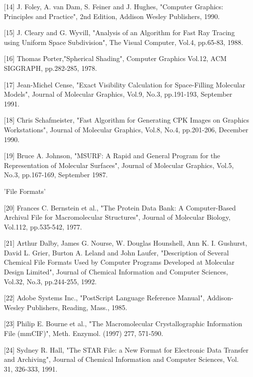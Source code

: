 [14] J. Foley, A. van Dam, S. Feiner and J. Hughes, "Computer Graphics:
Principles and Practice", 2nd Edition, Addison Wesley Publishers, 1990.

[15] J. Cleary and G. Wyvill, "Analysis of an Algorithm for Fast Ray
Tracing using Uniform Space Subdivision", The Visual Computer, Vol.4,
pp.65-83, 1988.

[16] Thomas Porter,"Spherical Shading", Computer Graphics Vol.12, ACM
SIGGRAPH, pp.282-285, 1978.

[17] Jean-Michel Cense, "Exact Visibility Calculation for Space-Filling
Molecular Models", Journal of Molecular Graphics, Vol.9, No.3,
pp.191-193, September 1991.

[18] Chris Schafmeister, "Fast Algorithm for Generating CPK Images on
Graphics Workstations", Journal of Molecular Graphics, Vol.8, No.4,
pp.201-206, December 1990.

[19] Bruce A. Johnson, "MSURF: A Rapid and General Program for the
Representation of Molecular Surfaces", Journal of Molecular Graphics,
Vol.5, No.3, pp.167-169, September 1987.

'File Formats'

[20] Frances C. Bernstein et al., "The Protein Data Bank: A
Computer-Based Archival File for Macromolecular Structures", Journal of
Molecular Biology, Vol.112, pp.535-542, 1977.

[21] Arthur Dalby, James G. Nourse, W. Douglas Hounshell, Ann K. I.
Gushurst, David L. Grier, Burton A. Leland and John Laufer, "Description
of Several Chemical File Formats Used by Computer Programs Developed at
Molecular Design Limited", Journal of Chemical Information and Computer
Sciences, Vol.32, No.3, pp.244-255, 1992.

[22] Adobe Systems Inc., "PostScript Language Reference Manual",
Addison-Wesley Publishers, Reading, Mass., 1985.

[23] Philip E. Bourne et al., "The Macromolecular Crystallographic
Information File (mmCIF)", Meth. Enzymol. (1997) 277, 571-590.

[24] Sydney R. Hall, "The STAR File: a New Format for Electronic Data
Transfer and Archiving", Journal of Chemical Information and Computer
Sciences, Vol. 31, 326-333, 1991.

